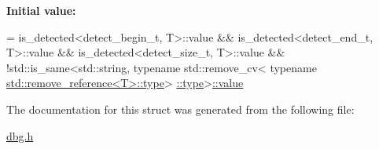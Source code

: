{\bfseries Initial value\+:}
\begin{DoxyCode}
=
      is\_detected<detect\_begin\_t, T>::value &&
      is\_detected<detect\_end\_t, T>::value &&
      is\_detected<detect\_size\_t, T>::value &&
      !std::is\_same<std::string,
                    \textcolor{keyword}{typename} std::remove\_cv<
                        \textcolor{keyword}{typename} \hyperlink{namespacedbg_a2365d80e3a3525e6025040383ff8661b}{std::remove\_reference<T>::type}>
      \hyperlink{namespacedbg_a2365d80e3a3525e6025040383ff8661b}{::type}>\hyperlink{structdbg_1_1detail_1_1is__container_aa9a4594488352384b65b36198ac414f8}{::value}
\end{DoxyCode}


The documentation for this struct was generated from the following file\+:\begin{DoxyCompactItemize}
\item 
\hyperlink{dbg_8h}{dbg.\+h}\end{DoxyCompactItemize}
